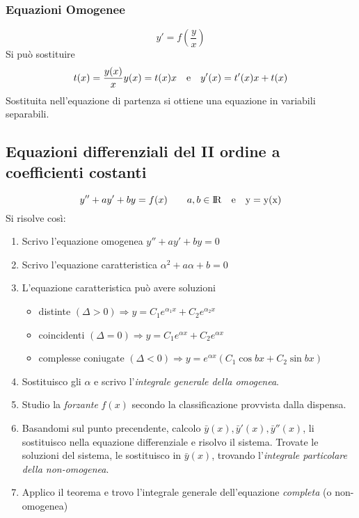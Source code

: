 \documentclass[10pt,a4paper,fleqn]{article}
\begin{document}
	\subsubsection{Equazioni Omogenee}
	\begin{equation}
		y'=f\left(\frac{y}{x}\right)
	\end{equation}
	Si può sostituire 
	\begin{equation}
		t(x)=\frac{y(x)}{x} \\ y(x) = t(x)x \quad \text{e} \quad y'(x) = t'(x)x + t(x)
	\end{equation}
	Sostituita nell'equazione di partenza si ottiene una equazione in variabili separabili.

	\subsection{Equazioni differenziali del II ordine a coefficienti costanti}

	\begin{equation}
		y'' + ay' + by = f(x) \qquad a,b \in \rm I\!R \quad \text{e} \quad y = y(x)
	\end{equation}
	Si risolve così:
	\begin{enumerate}
		\item Scrivo l'equazione omogenea $y'' + ay' + by = 0$
		\item Scrivo l'equazione caratteristica $\alpha^2 + a\alpha + b = 0$
		\item L'equazione caratteristica può avere soluzioni
			\begin{itemize}
				\item distinte $\left(\Delta > 0\right)\Rightarrow y = C_1e^{\alpha_1 x} + C_2e^{\alpha_2 x}$
				\item coincidenti $\left(\Delta = 0\right)\Rightarrow y = C_1e^{\alpha x} + C_2e^{\alpha x}$
				\item complesse coniugate $\left(\Delta < 0\right)\Rightarrow y = e^{\alpha x}\left(C_1\cos bx + C_2 \sin bx\right)$
			\end{itemize}
		\item Sostituisco gli $\alpha$ e scrivo l'\emph{integrale generale della omogenea}.
		\item Studio la \emph{forzante} $f(x)$ secondo la classificazione provvista dalla dispensa. 
		\item Basandomi sul punto precendente, calcolo $\bar y(x), \bar y'(x), \bar y''(x)$, li sostituisco nella equazione differenziale e risolvo il sistema. Trovate le soluzioni del sistema, le sostituisco in $\bar y(x)$, trovando l'\emph{integrale particolare della non-omogenea}.
		\item Applico il teorema e trovo l'integrale generale dell'equazione \emph{completa} (o non-omogenea)
	\end{enumerate}
\end{document}
